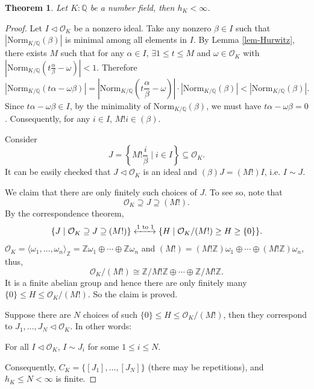 \documentclass[11pt]{book}
\newtheorem{theorem}{Theorem}[section]
\begin{document}
\begin{theorem}
    Let $K:\mathbb{Q}$ be a number field, then $h_{K}<\infty$. 
\end{theorem}

\begin{proof}
    Let $I\lhd \mathcal{O}_{K}$ be a nonzero ideal. Take any nonzero $\beta\in I$ such that $\left| \mathrm{Norm}_{K/\mathbb{Q}}(\beta) \right| $ is minimal among all elements in $I$. By Lemma \ref{lem-Hurwitz}, there exists $M$ such that for any $\alpha\in I$, $\exists 1\leq t\leq M$ and $\omega\in \mathcal{O}_{K}$ with $\left| \mathrm{Norm}_{K /\mathbb{Q}}(t\frac{\alpha}{\beta}-\omega) \right| <1$. Therefore 
    \[
    \left| \mathrm{Norm}_{K /\mathbb{Q}}(t\alpha-\omega\beta) \right|=\left| \mathrm{Norm}_{K /\mathbb{Q}}(t\frac{\alpha}{\beta}-\omega) \right|\cdot \left|\mathrm{Norm}_{K /\mathbb{Q}}(\beta)\right|<\left| \mathrm{Norm}_{K /\mathbb{Q}}(\beta) \right| .
    \] 
    Since $t\alpha-\omega\beta\in I$, by the minimality of $\mathrm{Norm}_{K /\mathbb{Q}}(\beta)$, we must have $t\alpha-\omega\beta=0$. Consequently, for any $i\in I$, $M!i\in (\beta)$. 

    \medskip
    Consider $$J=\left\{M!\frac{i}{\beta} \mid i\in I\right\}\subseteq \mathcal{O}_{K}.$$ It can be easily checked that $J\lhd \mathcal{O}_{K}$ is an ideal and $(\beta)J=(M!)I$, i.e. $I\sim J$. 

    \medskip
    We claim that there are only finitely such choices of $J$. To see so, note that 
    $$\mathcal{O}_{K}\supseteq J\supseteq (M!).$$ 
    By the correspondence theorem, 
        \[
        \{J \mid \mathcal{O}_{K}\supseteq J\supseteq (M!)\}\xleftrightarrow{1 \text{ to } 1} \{H \mid \mathcal{O}_{K} /(M!) \geq H\geq \{0\}\}.
        \]
        $\mathcal{O}_{K}=\langle \omega_{1},\dots, \omega_{n}\rangle_{\mathbb{Z}}=\mathbb{Z}\omega_{1}\oplus \cdots\oplus\mathbb{Z}\omega_{n}$ and $(M!)=(M!\mathbb{Z})\omega_{1}\oplus \cdots\oplus(M!\mathbb{Z})\omega_{n}$, thus, 
        \[
        \mathcal{O}_{K} /(M!)\cong \mathbb{Z}/M!\mathbb{Z}\oplus\cdots\oplus \mathbb{Z} /M!\mathbb{Z}.
        \]
        It is a finite abelian group and hence there are only finitely many $\{0\}\leq H\leq \mathcal{O}_{K} /(M!)$. So the claim is proved.

    \medskip
    Suppose there are $N$ choices of such $\{0\}\leq H\leq \mathcal{O}_{K} /(M!)$, then they correspond to
    $J_{1},\dots, J_{N} \lhd \mathcal{O}_K$. In other words:
    \begin{center}
        For all $I \lhd \mathcal{O}_K$, $I \sim J_i$ for some $1 \leq i \leq N$. 
    \end{center}
    Consequently, $C_{K}=\{[J_{1}],\dots, [J_{N}]\}$ (there may be repetitions), and $h_{K}\leq N <\infty$ is finite. 
\end{proof}
\end{document}
